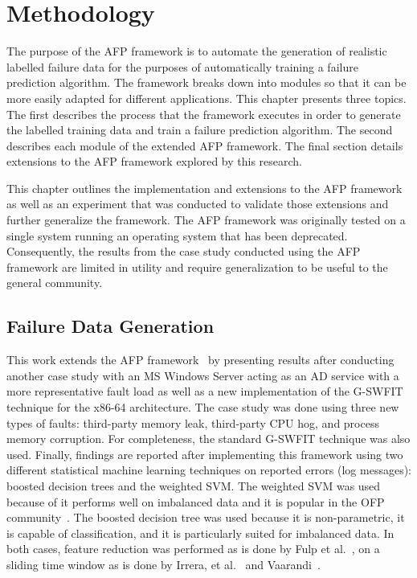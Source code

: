 \section{Methodology} \label{chapter3}
The purpose of the \ac{AFP} framework is to automate the generation of
realistic labelled failure data for the purposes of automatically training a
failure prediction algorithm.  The framework breaks down into modules so that
it can be more easily adapted for different applications.  This chapter
presents three topics.  The first describes the process that the framework
executes in order to generate the labelled training data and train a failure
prediction algorithm.  The second describes each module of the extended
\ac{AFP} framework.  The final section details extensions to the \ac{AFP}
framework explored by this research.

This chapter outlines the implementation and extensions to the \ac{AFP}
framework~\cite{irrera2015} as well as an experiment that was conducted to
validate those extensions and further generalize the framework.  The \ac{AFP}
framework was originally tested on a single system running an operating system
that has been deprecated.  Consequently, the results from the case study
conducted using the \ac{AFP} framework are limited in utility and require
generalization to be useful to the general community.

\subsection{Failure Data Generation} \label{sec:generation}
This work extends the \ac{AFP} framework~\cite{irrera2015} by presenting
results after conducting another case study with an \ac{MS} Windows Server
acting as an \ac{AD} service with a more representative fault load as well as a
new implementation of the \ac{G-SWFIT} technique for the x86-64 architecture.
The case study was done using three new types of faults: third-party memory
leak, third-party \ac{CPU} hog, and process memory corruption.  For
completeness, the standard \ac{G-SWFIT} technique was also used.  Finally,
findings are reported after implementing this framework using two different
statistical machine learning techniques on reported errors (log messages):
boosted decision trees and the weighted \ac{SVM}.  The weighted \ac{SVM} was
used because of it performs well on imbalanced data and it is popular in the
\ac{OFP} community~\cite{salfnerSurvey}.  The boosted decision tree was used
because it is non-parametric, it is capable of classification, and it is
particularly suited for imbalanced data.  In both cases, feature reduction was
performed as is done by Fulp et al.~\cite{fulp2008}, on a sliding time window
as is done by Irrera, et al.~\cite{irrera2013a} and
Vaarandi~\cite{vaarandi2002}.

